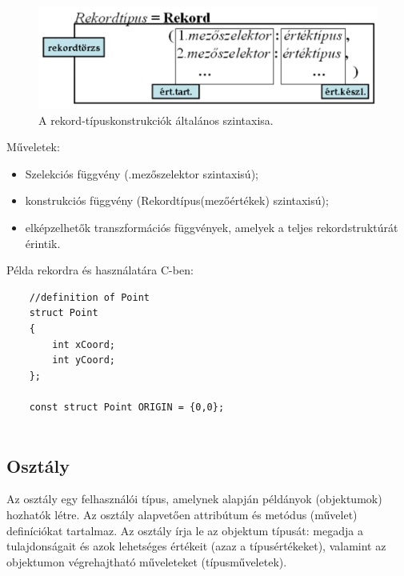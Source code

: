 \documentclass[margin=0px]{article}
\begin{document}
	\begin{figure}[H]
		\centering
		\includegraphics[width=0.7\linewidth]{img/rekord}
		\caption{A rekord-típuskonstrukciók általános szintaxisa.}
		\label{fig:rekord}
	\end{figure}
	
	\noindent Műveletek:
	\begin{itemize}
		\item	Szelekciós függvény (.mezőszelektor szintaxisú);
		
		\item	konstrukciós függvény (Rekordtípus(mezőértékek) szintaxisú);
		
		\item	elképzelhetők transzformációs függvények, amelyek a teljes rekordstruktúrát érintik.
	\end{itemize}
	
	\noindent Példa rekordra és használatára C-ben:
	\begin{verbatim}
	//definition of Point
	struct Point 
	{
	    int xCoord;
	    int yCoord;
	};
	
	const struct Point ORIGIN = {0,0};
	    
	\end{verbatim}
	
	\subsection{Osztály}
	
	Az osztály egy felhasználói típus, amelynek alapján példányok (objektumok)
	hozhatók létre. Az osztály alapvetően attribútum és metódus (művelet) definíciókat
	tartalmaz. Az osztály írja le az objektum típusát: megadja a tulajdonságait és azok
	lehetséges értékeit (azaz a típusértékeket), valamint az objektumon végrehajtható műveleteket (típusműveletek).\\
	
\end{document}
